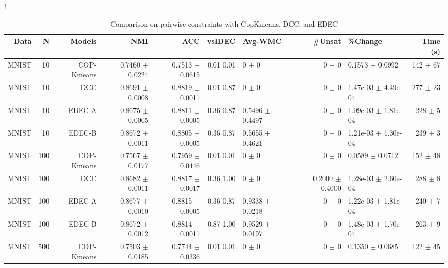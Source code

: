 \begin{table}[ht]
\caption{Comparison on pairwise constraints with CopKmeans, DCC, and EDEC}\label{tab:pw}
\resizebox{\columnwidth}!{
\begin{tabular}{ | r | r | r | r | r | r | H  r | H  r |}
\hline
Data & N & Models & NMI & ACC & vsIDEC & Avg-WMC & \#Unsat & \%Change & Time (s)  \\ \hline 
MNIST & 10 & COP-Kmeans & 0.7460 $\pm$ 0.0224 & 0.7513 $\pm$ 0.0615 & { \color{black}0.01} { \color{black}0.01} & 0 $\pm$ 0 & 0 $\pm$ 0 & 0.1573 $\pm$ 0.0992 & 142 $\pm$ 67 \\ 
MNIST & 10 & DCC & { \color{green} 0.8691 $\pm$ 0.0008} & { \color{green} 0.8819 $\pm$ 0.0011} & { \color{green} 0.01} { \color{green} 0.87} & 0 $\pm$ 0 & 0 $\pm$ 0 & 1.47e-03 $\pm$ 4.49e-04 & 277 $\pm$ 23 \\ 
MNIST & 10 & EDEC-A & 0.8675 $\pm$ 0.0005 & { \color{blue} 0.8811 $\pm$ 0.0005} & { \color{green} 0.36} { \color{black}0.87} & 0.5496 $\pm$ 0.4497 & 0 $\pm$ 0 & 1.09e-03 $\pm$ 1.81e-04 & 228 $\pm$ 5 \\ 
MNIST & 10 & EDEC-B & { \color{blue} 0.8672 $\pm$ 0.0011} & { \color{blue} 0.8805 $\pm$ 0.0005} & { \color{green} 0.36} { \color{black}0.87} & 0.5655 $\pm$ 0.4621 & 0 $\pm$ 0 & 1.21e-03 $\pm$ 1.30e-04 & 239 $\pm$ 3 \\ \hline 
MNIST & 100 & COP-Kmeans & 0.7567 $\pm$ 0.0177 & 0.7959 $\pm$ 0.0446 & { \color{black}0.01} { \color{black}0.01} & 0 $\pm$ 0 & 0 $\pm$ 0 & 0.0589 $\pm$ 0.0712 & 152 $\pm$ 48 \\ 
MNIST & 100 & DCC & { \color{green} 0.8682 $\pm$ 0.0011} & { \color{green} 0.8817 $\pm$ 0.0017} & { \color{green} 0.36} { \color{green} 1.00} & 0 $\pm$ 0 & 0.2000 $\pm$ 0.4000 & 1.28e-03 $\pm$ 2.60e-04 & 288 $\pm$ 8 \\ 
MNIST & 100 & EDEC-A & { \color{blue} 0.8677 $\pm$ 0.0010} & { \color{blue} 0.8815 $\pm$ 0.0005} & { \color{green} 0.36} { \color{green} 0.87} & 0.9338 $\pm$ 0.0218 & 0 $\pm$ 0 & 1.22e-03 $\pm$ 1.81e-04 & 240 $\pm$ 7 \\ 
MNIST & 100 & EDEC-B & { \color{blue} 0.8672 $\pm$ 0.0012} & { \color{blue} 0.8814 $\pm$ 0.0011} & { \color{green} 0.87} { \color{green} 1.00} & 0.9529 $\pm$ 0.0197 & 0 $\pm$ 0 & 1.48e-03 $\pm$ 1.70e-04 & 263 $\pm$ 9 \\ \hline 
MNIST & 500 & COP-Kmeans & 0.7503 $\pm$ 0.0185 & 0.7744 $\pm$ 0.0336 & { \color{black}0.01} { \color{black}0.01} & 0 $\pm$ 0 & 0 $\pm$ 0 & 0.1350 $\pm$ 0.0685 & 122 $\pm$ 45 \\ 

\end{tabular}}
\end{table}
